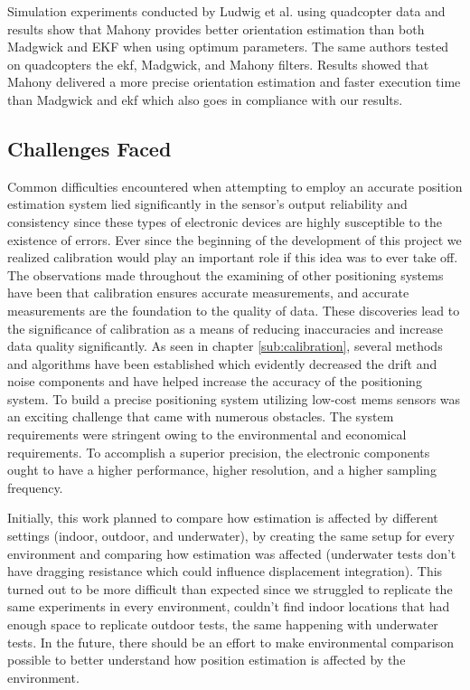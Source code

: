 Simulation experiments conducted by Ludwig et al. \cite{ludwig2018comparison} using quadcopter data and results show that Mahony provides better orientation estimation than both Madgwick and EKF when using optimum parameters. The same authors tested on \cite{ludwig2018comparisonuav} quadcopters the \acrshort{ekf}, Madgwick, and Mahony filters. Results showed that Mahony delivered a more precise orientation estimation and faster execution time than Madgwick and \acrshort{ekf} which also goes in compliance with our results.

\subsection{Challenges Faced}

Common difficulties encountered when attempting to employ an accurate position estimation system lied significantly in the sensor's output reliability and consistency since these types of electronic devices are highly susceptible to the existence of errors. Ever since the beginning of the development of this project we realized calibration would play an important role if this idea was to ever take off. The observations made throughout the examining of other positioning systems have been that calibration ensures accurate measurements, and accurate measurements are the foundation to the quality of data. These discoveries lead to the significance of calibration as a means of reducing inaccuracies and increase data quality significantly. As seen in chapter \ref{sub:calibration}, several methods and algorithms have been established which evidently decreased the drift and noise components and have helped increase the accuracy of the positioning system. To build a precise positioning system utilizing low-cost \acrshort{mems} sensors was an exciting challenge that came with numerous obstacles. The system requirements were stringent owing to the environmental and economical requirements. To accomplish a superior precision, the electronic components ought to have a higher performance, higher resolution, and a higher sampling frequency.

Initially, this work planned to compare how estimation is affected by different settings (indoor, outdoor, and underwater), by creating the same setup for every environment and comparing how estimation was affected (underwater tests don't have dragging resistance which could influence displacement integration). This turned out to be more difficult than expected since we struggled to replicate the same experiments in every environment, couldn't find indoor locations that had enough space to replicate outdoor tests, the same happening with underwater tests. In the future, there should be an effort to make environmental comparison possible to better understand how position estimation is affected by the environment.

